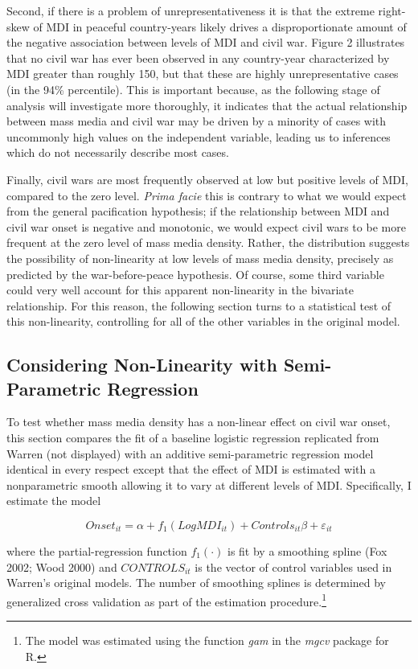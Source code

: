 \documentclass[11pt,article,oneside]{memoir}
\begin{document}
Second, if there is a problem of unrepresentativeness it is that the
extreme right-skew of MDI in peaceful country-years likely drives a
disproportionate amount of the negative association between levels of
MDI and civil war. Figure 2 illustrates that no civil war has ever been
observed in any country-year characterized by MDI greater than roughly
150, but that these are highly unrepresentative cases (in the 94\%
percentile). This is important because, as the following stage of
analysis will investigate more thoroughly, it indicates that the actual
relationship between mass media and civil war may be driven by a
minority of cases with uncommonly high values on the independent
variable, leading us to inferences which do not necessarily describe
most cases.

Finally, civil wars are most frequently observed at low but positive
levels of MDI, compared to the zero level. \emph{Prima facie} this is
contrary to what we would expect from the general pacification
hypothesis; if the relationship between MDI and civil war onset is
negative and monotonic, we would expect civil wars to be more frequent
at the zero level of mass media density. Rather, the distribution
suggests the possibility of non-linearity at low levels of mass media
density, precisely as predicted by the war-before-peace hypothesis. Of
course, some third variable could very well account for this apparent
non-linearity in the bivariate relationship. For this reason, the
following section turns to a statistical test of this non-linearity,
controlling for all of the other variables in the original model.

\subsection{Considering Non-Linearity with Semi-Parametric
Regression}\label{considering-non-linearity-with-semi-parametric-regression}

To test whether mass media density has a non-linear effect on civil war
onset, this section compares the fit of a baseline logistic regression
replicated from Warren (not displayed) with an additive semi-parametric
regression model identical in every respect except that the effect of
MDI is estimated with a nonparametric smooth allowing it to vary at
different levels of MDI. Specifically, I estimate the model

\[ Onset_{it} = \alpha + f_1 (LogMDI_{it}) + Controls_{it} \beta  + \varepsilon_{it} \]

where the partial-regression function $f_1 (\cdot)$ is fit by a
smoothing spline (Fox 2002; Wood 2000) and $CONTROLS_{it}$ is the vector
of control variables used in Warren's original models. The number of
smoothing splines is determined by generalized cross validation as part
of the estimation procedure.\footnote{The model was estimated using the
  function \emph{gam} in the \emph{mgcv} package for R.}
\end{document}
